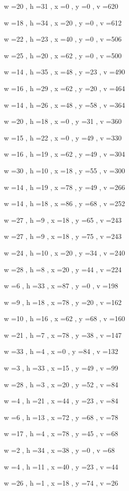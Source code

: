 \documentclass[11pt]{article}
\begin{document}
w =20 , h =31 , x =0 , y =0 , v =620
\par
w =18 , h =34 , x =20 , y =0 , v =612
\par
w =22 , h =23 , x =40 , y =0 , v =506
\par
w =25 , h =20 , x =62 , y =0 , v =500
\par
w =14 , h =35 , x =48 , y =23 , v =490
\par
w =16 , h =29 , x =62 , y =20 , v =464
\par
w =14 , h =26 , x =48 , y =58 , v =364
\par
w =20 , h =18 , x =0 , y =31 , v =360
\par
w =15 , h =22 , x =0 , y =49 , v =330
\par
w =16 , h =19 , x =62 , y =49 , v =304
\par
w =30 , h =10 , x =18 , y =55 , v =300
\par
w =14 , h =19 , x =78 , y =49 , v =266
\par
w =14 , h =18 , x =86 , y =68 , v =252
\par
w =27 , h =9 , x =18 , y =65 , v =243
\par
w =27 , h =9 , x =18 , y =75 , v =243
\par
w =24 , h =10 , x =20 , y =34 , v =240
\par
w =28 , h =8 , x =20 , y =44 , v =224
\par
w =6 , h =33 , x =87 , y =0 , v =198
\par
w =9 , h =18 , x =78 , y =20 , v =162
\par
w =10 , h =16 , x =62 , y =68 , v =160
\par
w =21 , h =7 , x =78 , y =38 , v =147
\par
w =33 , h =4 , x =0 , y =84 , v =132
\par
w =3 , h =33 , x =15 , y =49 , v =99
\par
w =28 , h =3 , x =20 , y =52 , v =84
\par
w =4 , h =21 , x =44 , y =23 , v =84
\par
w =6 , h =13 , x =72 , y =68 , v =78
\par
w =17 , h =4 , x =78 , y =45 , v =68
\par
w =2 , h =34 , x =38 , y =0 , v =68
\par
w =4 , h =11 , x =40 , y =23 , v =44
\par
w =26 , h =1 , x =18 , y =74 , v =26
\par
\newpage
\end{document}
